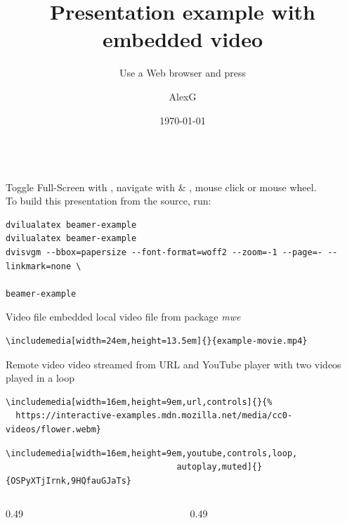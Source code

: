 \documentclass[dvisvgm,hypertex,aspectratio=169]{beamer}
\title{Presentation example with embedded video}
\subtitle{Use a Web browser and press \keys{F11}}
\author{AlexG}
\date{\today}
\begin{document}

\begin{frame}[fragile]
\titlepage\footnotesize
\makebox[0.3\linewidth]{\hrulefill}\\[1ex]
Toggle Full-Screen with , navigate with  \& , mouse click or mouse wheel.\\[2ex]
To build this presentation from the source, run:\vspace{-2ex}
\begin{verbatim}
dvilualatex beamer-example
dvilualatex beamer-example
dvisvgm --bbox=papersize --font-format=woff2 --zoom=-1 --page=- --linkmark=none \
                                                                     beamer-example
\end{verbatim}
\end{frame}

\begin{frame}[fragile]{Video file}
embedded local video file from package \emph{mwe}
\begin{verbatim}
\includemedia[width=24em,height=13.5em]{}{example-movie.mp4}
\end{verbatim}
  \begin{center}
  \end{center}
\end{frame}

\begin{frame}[fragile]{Remote video}
video streamed from URL and YouTube player with two videos played in a loop
\begin{verbatim}
\includemedia[width=16em,height=9em,url,controls]{}{%
  https://interactive-examples.mdn.mozilla.net/media/cc0-videos/flower.webm}
\end{verbatim}
\begin{verbatim}
\includemedia[width=16em,height=9em,youtube,controls,loop,
                                  autoplay,muted]{}{OSPyXTjIrnk,9HQfauGJaTs}
\end{verbatim}
\vspace{1ex}
\begin{columns}[onlytextwidth,b]
  \begin{column}{0.49\linewidth}
  \end{column}
  \begin{column}{0.49\linewidth}
  \end{column}
\end{columns}
\end{frame}
\end{document}
